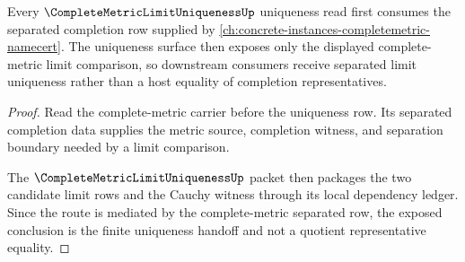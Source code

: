 \begin{theorem}
\label{thm:complete-metric-limit-uniqueness-complete-metric-dependency-route}
Every $\CompleteMetricLimitUniquenessUp$ uniqueness read first consumes the separated completion row supplied by \autoref{ch:concrete-instances-completemetric-namecert}. The uniqueness surface then exposes only the displayed complete-metric limit comparison, so downstream consumers receive separated limit uniqueness rather than a host equality of completion representatives.
\end{theorem}
\begin{proof}
Read the complete-metric carrier before the uniqueness row. Its separated completion data supplies the metric source, completion witness, and separation boundary needed by a limit comparison.

The $\CompleteMetricLimitUniquenessUp$ packet then packages the two candidate limit rows and the Cauchy witness through its local dependency ledger. Since the route is mediated by the complete-metric separated row, the exposed conclusion is the finite uniqueness handoff and not a quotient representative equality.
\end{proof}
